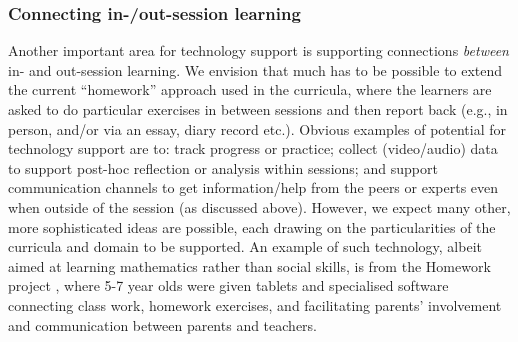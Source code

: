 \documentclass[prodmode,acmtochi]{acmsmall}
\newcommand{\todo}[1]{\textrm{\textrm{\textcolor{LightBlue}{[[#1]]}}}}
\newcommand{\GeraldineTODO}[1]{}
\begin{document}
\subsubsection{Connecting in-/out-session learning}
Another important area for technology support is supporting connections \textit{between}  in- and out-session learning. We envision that much has to be possible to extend the current ``homework'' approach used in the curricula, where the learners are asked to do particular exercises in between sessions and then report back (e.g., in person, and/or via an essay, diary record etc.)\GeraldineTODO{G: do these also need to be mentioned as explicit strategies in the discussions of the  learning principles and current approaches?   }.  Obvious examples of potential for technology support are to: track progress or practice; collect (video/audio) data to support post-hoc reflection or analysis within sessions; and support communication channels to get information/help from the peers or experts even when outside of the session (as discussed above). However, we expect many other, more sophisticated ideas are possible, each drawing on the particularities of the curricula and domain to be supported. An example of such technology, albeit aimed at learning mathematics rather than social skills, is from the Homework project \cite{Luckin2008}, where 5-7 year olds were given tablets and specialised software connecting class work, homework exercises, and facilitating parents' involvement and communication between parents and teachers.


        
\end{document}
